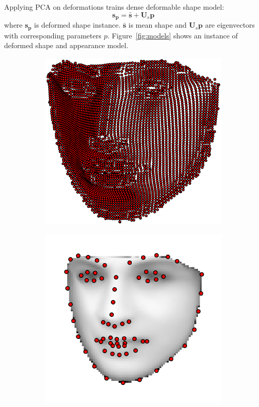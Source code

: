 Applying PCA on deformations trains dense deformable shape model:
\begin{equation*}
    \bm{s_p}=\bm{\bar{s}} + \bm{U}_s\bm{p}
\end{equation*}
where $\bm{s_p}$ is deformed shape instance. $\bm{\bar{s}}$ is mean shape and $\bm{U}_s\bm{p}$ are eigenvectors with corresponding parameters $p$. Figure~\ref{fig:models} shows an instance of deformed shape and appearance model.
\begin{figure}[h!]
    \centering
    \begin{subfigure}[b]{0.4\textwidth}
            \includegraphics[width=\textwidth]{resources/Fig_dAAM/of_shape}
    \end{subfigure}
  	\hfill
    \begin{subfigure}[b]{0.4\textwidth}
            \includegraphics[width=\textwidth]{resources/Fig_dAAM/of_app}

\end{subfigure}
\end{figure}
